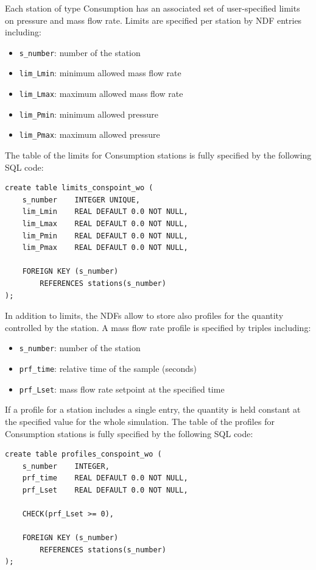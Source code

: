 Each station of type Consumption has an associated set of user-specified limits
on pressure and mass flow rate. Limits are specified per station by NDF entries
including:
\begin{itemize}
    \item \texttt{s\_number}:   number of the station
    \item \texttt{lim\_Lmin}:   minimum allowed mass flow rate
    \item \texttt{lim\_Lmax}:   maximum allowed mass flow rate
    \item \texttt{lim\_Pmin}:   minimum allowed pressure
    \item \texttt{lim\_Pmax}:   maximum allowed pressure
\end{itemize}
The table of the limits for Consumption stations is fully specified by the following SQL code:
\begin{verbatim}
create table limits_conspoint_wo (
    s_number    INTEGER UNIQUE,
    lim_Lmin    REAL DEFAULT 0.0 NOT NULL,
    lim_Lmax    REAL DEFAULT 0.0 NOT NULL,
    lim_Pmin    REAL DEFAULT 0.0 NOT NULL,
    lim_Pmax    REAL DEFAULT 0.0 NOT NULL,

    FOREIGN KEY (s_number)
        REFERENCES stations(s_number)
);
\end{verbatim}
In addition to limits, the NDFs allow to store also profiles for the quantity
controlled by the station. A mass flow rate profile is specified by triples including:
\begin{itemize}
    \item \texttt{s\_number}:   number of the station
    \item \texttt{prf\_time}:   relative time of the sample (seconds)
    \item \texttt{prf\_Lset}:   mass flow rate setpoint at the specified time
\end{itemize}
If a profile for a station includes a single entry, the quantity is held constant
at the specified value for the whole simulation. The table of the profiles for
Consumption stations is fully specified by the following SQL code:
\begin{verbatim}
create table profiles_conspoint_wo (
    s_number    INTEGER,
    prf_time    REAL DEFAULT 0.0 NOT NULL,
    prf_Lset    REAL DEFAULT 0.0 NOT NULL,

    CHECK(prf_Lset >= 0),

    FOREIGN KEY (s_number)
        REFERENCES stations(s_number)
);
\end{verbatim}



